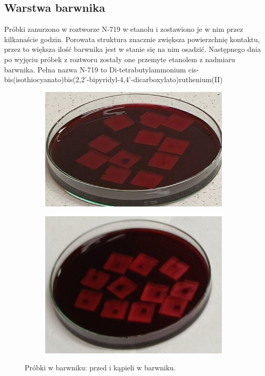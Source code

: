 \documentclass[12pt]{article}
\begin{document}
	\subsection{Warstwa barwnika}
	Próbki zanurzono w roztworze N-719 w etanolu i zostawiono je w nim przez kilkanaście godzin. Porowata struktura  znacznie zwiększa powierzchnię kontaktu, przez to większa ilość barwnika jest w stanie się na nim osadzić. Następnego dnia po wyjęciu próbek z roztworu zostały one przemyte etanolem z nadmiaru barwnika. Pełna nazwa N-719 to Di-tetrabutylammonium cis-bis(isothiocyanato)bis(2,2'-bipyridyl-4,4'-dicarboxylato)ruthenium(II)
	\begin{figure}[H]
		\centering
		\begin{subfigure}{0.45\textwidth}
			\centering
			\includegraphics[width=\textwidth]{probki_w_barwniku_przed.png}
			\caption{\label{fig:barwnik_przed}}
		\end{subfigure}
		\begin{subfigure}{0.45\textwidth}
			\includegraphics[width=\textwidth]{probki_w_barwniku_po.png}
			\caption{\label{fig:barwnik_po}}
		\end{subfigure}
		\captionsetup{subrefformat=parens}
		\caption{Próbki w barwniku:  przed i  kąpieli w barwniku.}
	\end{figure}
	
\end{document}
